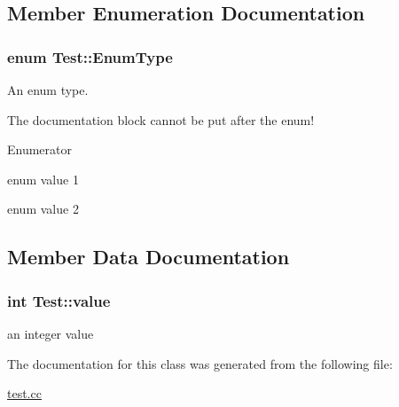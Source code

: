 \subsection{Member Enumeration Documentation}
\hypertarget{classTest_a26bf93efdaea3c6e2cfa4119c3755d3f}{
\subsubsection[{Enum\+Type}]{\setlength{\rightskip}{0pt plus 5cm}enum {\bf Test\+::\+Enum\+Type}}}\label{classTest_a26bf93efdaea3c6e2cfa4119c3755d3f}
An enum type.
\begin{DoxyItemize}
\item The documentation block cannot be put after the enum! 
\end{DoxyItemize}\begin{Desc}
\item[Enumerator]\par
\begin{description}
\item[{\em 
\hypertarget{classTest_a26bf93efdaea3c6e2cfa4119c3755d3faacfab1e4105c05a2e503931a0e82b5b0}{E\+Val1}\label{classTest_a26bf93efdaea3c6e2cfa4119c3755d3faacfab1e4105c05a2e503931a0e82b5b0}
}]enum value 1 \item[{\em 
\hypertarget{classTest_a26bf93efdaea3c6e2cfa4119c3755d3fae2fa04fb1c4db1f7d72b8781ba19ffcc}{E\+Val2}\label{classTest_a26bf93efdaea3c6e2cfa4119c3755d3fae2fa04fb1c4db1f7d72b8781ba19ffcc}
}]enum value 2 \end{description}
\end{Desc}


\subsection{Member Data Documentation}
\hypertarget{classTest_ad55002283eba8ffa062dfb849f6c077c}{
\subsubsection[{value}]{\setlength{\rightskip}{0pt plus 5cm}int Test\+::value\hspace{0.3cm}{\ttfamily [protected]}}}\label{classTest_ad55002283eba8ffa062dfb849f6c077c}
an integer value 

The documentation for this class was generated from the following file\+:\begin{DoxyCompactItemize}
\item 
\hyperlink{test_8cc}{test.\+cc}\end{DoxyCompactItemize}
